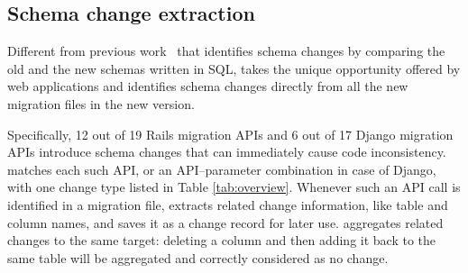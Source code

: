 \subsection{Schema change extraction}
\label{subsec:schema-change-extraction}
Different from previous work~\cite{wang2019synthesizing} that identifies schema changes by comparing the old and the new schemas written in SQL,
\Tool takes the unique opportunity offered by
web applications and identifies schema changes directly from all the new migration
files in the new version.

Specifically, 12 out of 19 Rails migration APIs and 6 out of 17 Django
migration APIs introduce schema changes that can immediately cause code inconsistency.
 \Tool{} matches each such API, or an API--parameter combination in case of Django, with one change type listed
 in Table \ref{tab:overview}. Whenever such an API call
 is identified in a migration file, \Tool{} extracts
 related change information, like table and column
 names, and saves it as a change
 record for later use.
 \Tool aggregates related changes to the
 same target:  
deleting a column and then adding it back to the same table will be aggregated
and correctly considered as no change.
 

